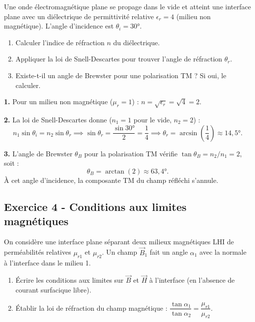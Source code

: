 \documentclass[12pt,a4paper]{article}
\begin{document}
\begin{boiteexercice}
Une onde électromagnétique plane se propage dans le vide et atteint une interface plane avec un diélectrique de permittivité relative $\epsilon_r = 4$ (milieu non magnétique). L'angle d'incidence est $\theta_i = 30°$.
\begin{enumerate}
  \item Calculer l'indice de réfraction $n$ du diélectrique.
  \item Appliquer la loi de Snell-Descartes pour trouver l'angle de réfraction $\theta_r$.
  \item Existe-t-il un angle de Brewster pour une polarisation TM ? Si oui, le calculer.
\end{enumerate}
\end{boiteexercice}

\begin{boitecorrige}

\textbf{1.} Pour un milieu non magnétique ($\mu_r=1$) : $n = \sqrt{\epsilon_r} = \sqrt{4} = 2$.

\textbf{2.} La loi de Snell-Descartes donne ($n_1=1$ pour le vide, $n_2=2$) :
\[
n_1\sin\theta_i = n_2\sin\theta_r \implies \sin\theta_r = \frac{\sin 30°}{2} = \frac{1}{4}
\implies \theta_r = \arcsin\!\left(\frac{1}{4}\right) \approx 14{,}5°.
\]

\textbf{3.} L'angle de Brewster $\theta_B$ pour la polarisation TM vérifie $\tan\theta_B = n_2/n_1 = 2$, soit :
\[
\theta_B = \arctan(2) \approx 63{,}4°.
\]
À cet angle d'incidence, la composante TM du champ réfléchi s'annule.
\end{boitecorrige}

\subsection*{Exercice 4 - Conditions aux limites magnétiques \niveau{\moyen}}

\begin{boiteexercice}
On considère une interface plane séparant deux milieux magnétiques LHI de perméabilités relatives $\mu_{r1}$ et $\mu_{r2}$. Un champ $\vec{B}_1$ fait un angle $\alpha_1$ avec la normale à l'interface dans le milieu 1.
\begin{enumerate}
  \item Écrire les conditions aux limites sur $\vec{B}$ et $\vec{H}$ à l'interface (en l'absence de courant surfacique libre).
  \item Établir la loi de réfraction du champ magnétique : $\dfrac{\tan\alpha_1}{\tan\alpha_2} = \dfrac{\mu_{r1}}{\mu_{r2}}$.
\end{enumerate}
\end{boiteexercice}
\end{document}
